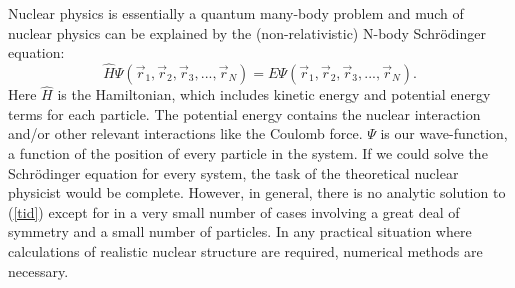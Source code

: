 Nuclear physics is essentially a quantum 
many-body problem and much of nuclear physics can be explained by the 
(non-relativistic) N-body Schr\"{o}dinger equation:
\begin{equation}\label{tid}
	\hat{H}\Psi(\vec{r}_1,\vec{r}_2,\vec{r}_3,...,\vec{r}_N)=E\Psi(\vec{r}_1,\vec{r}_2,\vec{r}_3,...,\vec{r}_N).
\end{equation}	
Here $\hat{H}$ is the Hamiltonian, which includes kinetic energy 
and potential energy terms for each particle. The potential energy contains the 
nuclear interaction and/or other relevant 
interactions like the Coulomb force\cite{Johnson13}. $\Psi$ is our wave-function,  
a function of the position of every particle in the system. 
If we could solve the Schr\"{o}dinger equation for every system, the task of the 
theoretical nuclear physicist would be complete. However, in general, there is 
no analytic solution to (\ref{tid}) except for in a very small number of cases involving 
a great deal of symmetry and a small number of particles. In any practical situation 
where calculations of realistic nuclear structure are required, numerical methods are necessary. 

